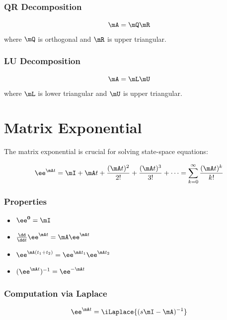 \subsubsection{QR Decomposition}
\begin{equation}
\mA = \mQ\mR
\end{equation}
where $\mQ$ is orthogonal and $\mR$ is upper triangular.

\subsubsection{LU Decomposition}
\begin{equation}
\mA = \mL\mU
\end{equation}
where $\mL$ is lower triangular and $\mU$ is upper triangular.

\section{Matrix Exponential}

The matrix exponential is crucial for solving state-space equations:

\begin{definitionbox}[title=Definition 0.6: Matrix Exponential]
\begin{equation}
\ee^{\mA t} = \mI + \mA t + \frac{(\mA t)^2}{2!} + \frac{(\mA t)^3}{3!} + \cdots = \sum_{k=0}^{\infty} \frac{(\mA t)^k}{k!}
\end{equation}
\end{definitionbox}

\subsubsection{Properties}
\begin{itemize}
    \item $\ee^{\mathbf{0}} = \mI$
    \item $\frac{\dd}{\dd t}\ee^{\mA t} = \mA\ee^{\mA t}$
    \item $\ee^{\mA(t_1+t_2)} = \ee^{\mA t_1}\ee^{\mA t_2}$
    \item $(\ee^{\mA t})^{-1} = \ee^{-\mA t}$
\end{itemize}

\subsubsection{Computation via Laplace}
\begin{equation}
\ee^{\mA t} = \iLaplace\{(s\mI - \mA)^{-1}\}
\end{equation}

